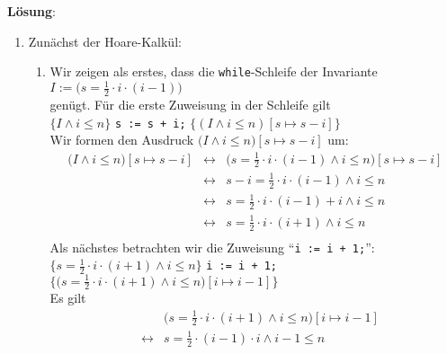 \documentclass{article}
\renewcommand{\labelenumii}{\arabic{enumii}.}
\begin{document}
\noindent
\textbf{L\"osung}:
\begin{enumerate}
\item Zun\"achst der Hoare-Kalk\"ul:
\begin{enumerate}
      \renewcommand{\labelenumii}{\arabic{enumii}.}
\item Wir zeigen als erstes, dass die \texttt{while}-Schleife der Invariante 
      \\[0.2cm]
      \hspace*{1.3cm}
      $I := \bigl(s = \frac{1}{2} \cdot i \cdot (i - 1)\bigr)$ 
      \\[0.2cm]
      gen\"ugt.  
      F\"ur die erste Zuweisung in der Schleife gilt
      \\[0.2cm]
      \hspace*{1.3cm}
      $\{ I \wedge i \leq n \}$ \quad \texttt{s := s + i;} \quad $\{ (I \wedge i \leq n)[s \mapsto s - i] \}$
      \\[0.2cm]
      Wir formen den Ausdruck $\bigl(I \wedge i \leq n\bigr)[s \mapsto s - i]$ um:
      \begin{eqnarray*}
        \bigl(I \wedge i \leq n\bigr)[s \mapsto s - i] 
        & \leftrightarrow & \bigl(s = \frac{1}{2} \cdot i \cdot (i-1) \wedge i \leq n\bigr)[s \mapsto s - i] \\
        & \leftrightarrow & s - i = \frac{1}{2} \cdot i \cdot (i-1) \wedge i \leq n \\
        & \leftrightarrow & s = \frac{1}{2} \cdot i \cdot (i-1) + i \wedge i \leq n \\
        & \leftrightarrow & s = \frac{1}{2} \cdot i \cdot (i+1) \wedge i \leq n \\
      \end{eqnarray*}
      Als n\"achstes betrachten wir die Zuweisung ``\texttt{i := i + 1;}'':
      \\[0.2cm]
      \hspace*{1.3cm}
      $\{ s = \frac{1}{2} \cdot i \cdot (i+1) \wedge i \leq n \}$ \quad \texttt{i := i + 1;} \quad
      $\{ \bigl(s = \frac{1}{2} \cdot i \cdot (i+1)\wedge i \leq n\bigr)[i \mapsto i - 1] \}$ 
      \\[0.2cm]
      Es gilt 
      \begin{eqnarray*}        
      &                 & \bigl(s = \frac{1}{2} \cdot i \cdot (i+1)\wedge i \leq n\bigr)[i \mapsto i - 1] \\
      & \leftrightarrow & s = \frac{1}{2} \cdot (i-1) \cdot i \wedge i - 1 \leq n                         \\

\end{eqnarray*}
\end{enumerate}
\end{enumerate}
\end{document}
